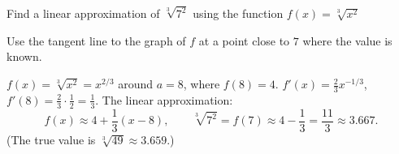 
\begin{question}
Find a linear approximation of $\sqrt[3]{7^2}$ using the function $f(x)=\sqrt[3]{x^2}$
\end{question}

\begin{hint}
Use the tangent line to the graph of $f$ at a point close to $7$ where the value is known.
\end{hint}

\begin{solution}
$f(x)=\sqrt[3]{x^2}=x^{2/3}$ around $a=8$, where $f(8)=4$. $f'(x)=\frac23x^{-1/3}$, $f'(8)=\frac23\cdot\frac12=\frac13$. The linear approximation:
\[ f(x)\approx4+\frac13(x-8), \qquad \sqrt[3]{7^2}=f(7)\approx4-\frac13=\boxed{\frac{11}{3}\approx3.667}. \]
(The true value is $\sqrt[3]{49}\approx3.659$.)
\end{solution}
